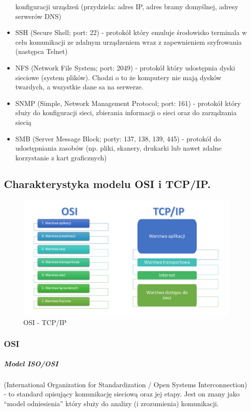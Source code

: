 \documentclass[a4paper,12pt,oneside]{book}
\begin{document}
\begin{itemize}
					konfiguracji urządzeń (przydziela: adres IP, adres bramy domyślnej, adresy
					serwerów DNS)
					\item SSH (Secure Shell; port: 22) - protokół który emuluje środowisko terminala w celu
					komunikacji ze zdalnym urządzeniem wraz z zapewnieniem szyfrowania (następca
					Telnet)
					\item NFS (Network File System; port: 2049) - protokół który udostępnia dyski sieciowe
					(system plików). Chodzi o to że komputery nie mają dysków twardych, a wszystkie
					dane sa na serwerze.
					\item SNMP (Simple, Network Management Protocol; port: 161) - protokół który służy do
					konfiguracji sieci, zbierania informacji o sieci oraz do zarządzania siecią
					\item SMB (Server Message Block; porty: 137, 138, 139, 445) - protokół do udostępniania
					zasobów (np. pliki, skanery, drukarki lub nawet zdalne korzystanie z kart graficznych)
				\end{itemize}
			\newpage\subsection{Charakterystyka modelu OSI i TCP/IP.}
			\label{model}
				\begin{figure}[h!]
					\centering\includegraphics[scale=0.45]{osi-tcp.png}
					\caption{OSI - TCP/IP}
				\end{figure}
				\subsubsection{OSI}
				\subparagraph{Model ISO/OSI} (International Organization for Standardization / Open Systems
				Interconnection) - to standard opisujący komunikację sieciową oraz jej etapy. Jest on znany
				jako “model odniesienia” który służy do analizy (i zrozumienia) komunikacji.
				
\end{document}
